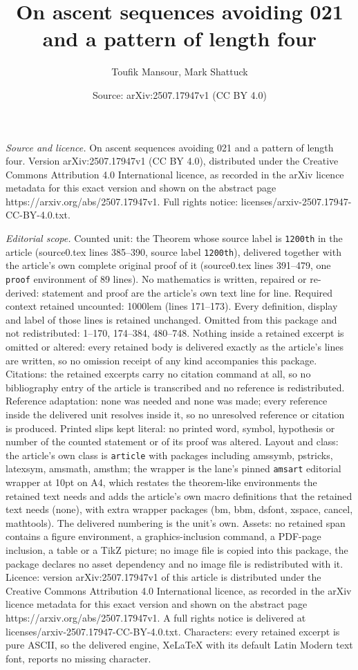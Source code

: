 \documentclass[10pt,a4paper]{amsart}
\title[On ascent sequences avoiding 021 and a pattern of length fou]{On ascent sequences avoiding 021 and a pattern of length four}
\author{Toufik Mansour, Mark Shattuck}
\date{Source: arXiv:2507.17947v1 (CC BY 4.0)}
\begin{document}
\maketitle

\noindent\emph{Source and licence.} On ascent sequences avoiding 021 and a pattern of length four. Version arXiv:2507.17947v1 (CC BY 4.0), distributed under the Creative Commons Attribution 4.0 International licence, as recorded in the arXiv licence metadata for this exact version and shown on the abstract page https://arxiv.org/abs/2507.17947v1. Full rights notice: licenses/arxiv-2507.17947-CC-BY-4.0.txt.\par\smallskip

\noindent\textit{Editorial scope.} Counted unit: the Theorem whose source label is \texttt{1200th} in the article (source0.tex lines 385--390, source label \texttt{1200th}), delivered together with the article's own complete original proof of it (source0.tex lines 391--479, one \texttt{proof} environment of 89 lines). No mathematics is written, repaired or re-derived: statement and proof are the article's own text line for line. Required context retained uncounted: 1000lem (lines 171--173). Every definition, display and label of those lines is retained unchanged. Omitted from this package and not redistributed: 1--170, 174--384, 480--748. Nothing inside a retained excerpt is omitted or altered: every retained body is delivered exactly as the article's lines are written, so no omission receipt of any kind accompanies this package. Citations: the retained excerpts carry no citation command at all, so no bibliography entry of the article is transcribed and no reference is redistributed. Reference adaptation: none was needed and none was made; every reference inside the delivered unit resolves inside it, so no unresolved reference or citation is produced. Printed slips kept literal: no printed word, symbol, hypothesis or number of the counted statement or of its proof was altered. Layout and class: the article's own class is \texttt{article} with packages including amssymb, pstricks, latexsym, amsmath, amsthm; the wrapper is the lane's pinned \texttt{amsart} editorial wrapper at 10pt on A4, which restates the theorem-like environments the retained text needs and adds the article's own macro definitions that the retained text needs (none), with extra wrapper packages (bm, bbm, dsfont, xspace, cancel, mathtools). The delivered numbering is the unit's own. Assets: no retained span contains a figure environment, a graphics-inclusion command, a PDF-page inclusion, a table or a TikZ picture; no image file is copied into this package, the package declares no asset dependency and no image file is redistributed with it. Licence: version arXiv:2507.17947v1 of this article is distributed under the Creative Commons Attribution 4.0 International licence, as recorded in the arXiv licence metadata for this exact version and shown on the abstract page https://arxiv.org/abs/2507.17947v1. A full rights notice is delivered at licenses/arxiv-2507.17947-CC-BY-4.0.txt. Characters: every retained excerpt is pure ASCII, so the delivered engine, XeLaTeX with its default Latin Modern text font, reports no missing character.
\end{document}
